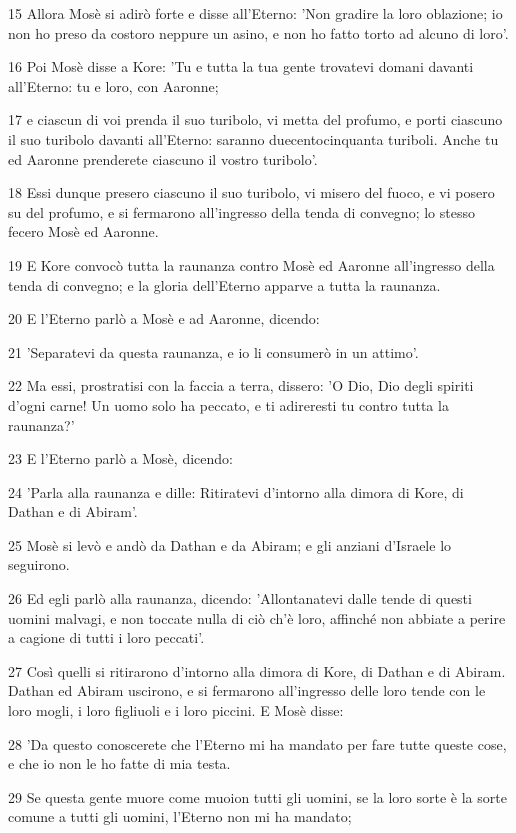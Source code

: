 \par 15 Allora Mosè si adirò forte e disse all'Eterno: 'Non gradire la loro oblazione; io non ho preso da costoro neppure un asino, e non ho fatto torto ad alcuno di loro'.
\par 16 Poi Mosè disse a Kore: 'Tu e tutta la tua gente trovatevi domani davanti all'Eterno: tu e loro, con Aaronne;
\par 17 e ciascun di voi prenda il suo turibolo, vi metta del profumo, e porti ciascuno il suo turibolo davanti all'Eterno: saranno duecentocinquanta turiboli. Anche tu ed Aaronne prenderete ciascuno il vostro turibolo'.
\par 18 Essi dunque presero ciascuno il suo turibolo, vi misero del fuoco, e vi posero su del profumo, e si fermarono all'ingresso della tenda di convegno; lo stesso fecero Mosè ed Aaronne.
\par 19 E Kore convocò tutta la raunanza contro Mosè ed Aaronne all'ingresso della tenda di convegno; e la gloria dell'Eterno apparve a tutta la raunanza.
\par 20 E l'Eterno parlò a Mosè e ad Aaronne, dicendo:
\par 21 'Separatevi da questa raunanza, e io li consumerò in un attimo'.
\par 22 Ma essi, prostratisi con la faccia a terra, dissero: 'O Dio, Dio degli spiriti d'ogni carne! Un uomo solo ha peccato, e ti adireresti tu contro tutta la raunanza?'
\par 23 E l'Eterno parlò a Mosè, dicendo:
\par 24 'Parla alla raunanza e dille: Ritiratevi d'intorno alla dimora di Kore, di Dathan e di Abiram'.
\par 25 Mosè si levò e andò da Dathan e da Abiram; e gli anziani d'Israele lo seguirono.
\par 26 Ed egli parlò alla raunanza, dicendo: 'Allontanatevi dalle tende di questi uomini malvagi, e non toccate nulla di ciò ch'è loro, affinché non abbiate a perire a cagione di tutti i loro peccati'.
\par 27 Così quelli si ritirarono d'intorno alla dimora di Kore, di Dathan e di Abiram. Dathan ed Abiram uscirono, e si fermarono all'ingresso delle loro tende con le loro mogli, i loro figliuoli e i loro piccini. E Mosè disse:
\par 28 'Da questo conoscerete che l'Eterno mi ha mandato per fare tutte queste cose, e che io non le ho fatte di mia testa.
\par 29 Se questa gente muore come muoion tutti gli uomini, se la loro sorte è la sorte comune a tutti gli uomini, l'Eterno non mi ha mandato;

